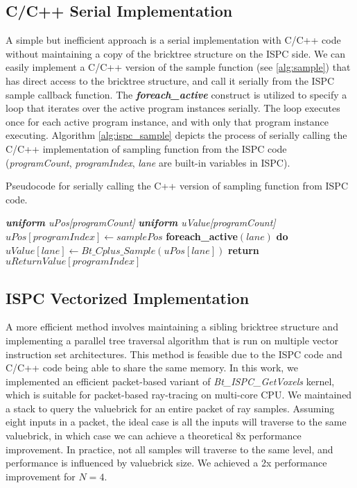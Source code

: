 \subsection{C/C++ Serial Implementation}

A simple but inefficient approach is a serial implementation with C/C++ code without
maintaining a copy of the bricktree structure on the ISPC side. We can easily 
implement a C/C++ version of the sample function (see \cref{alg:sample}) that has direct
access to the bricktree structure, and call it serially from the ISPC sample callback
function. The \textbf{\textit{foreach\_active}} construct is
utilized to specify a loop that iterates over the active program instances serially.
The loop executes once for each active program instance, and with only that program
instance executing. Algorithm \ref{alg:ispc_sample} depicts the process of serially calling 
the C/C++ implementation of sampling function from the ISPC code (\textit{programCount},
\textit{programIndex}, \textit{lane} are built-in variables in ISPC). 

\begin{algorithm}
	\caption{Pseudocode for serially calling the C++ version of sampling function from ISPC code. }\label{alg:ispc_sample}
	\begin{algorithmic}[1]
        	\State \textit{\textbf{uniform} uPos[programCount]}
            \State \textit{\textbf{uniform} uValue[programCount]}
            \State $uPos[programIndex] \gets samplePos$
            \State \textbf{foreach\_active}$(lane)$ \textbf{do}
            	\State \ \ \ \ $uValue[lane] \gets Bt\_Cplus\_Sample(uPos[lane])$
            \State \textbf{return} $uReturnValue[programIndex]$           
    	\EndProcedure
	\end{algorithmic}
\end{algorithm}


\subsection{ISPC Vectorized Implementation}
A more efficient method involves maintaining a sibling bricktree structure and 
implementing a parallel tree traversal algorithm that is run on multiple vector
instruction set architectures.
This method is feasible due to the ISPC code and C/C++ code being able to share the same memory.
In this work, we implemented an efficient packet-based variant of 
\textit{Bt\_ISPC\_GetVoxels} kernel, which is suitable for packet-based ray-tracing
on multi-core CPU. We maintained a stack to query the valuebrick for an entire
packet of ray samples. Assuming eight inputs in a packet, the ideal case is all the inputs will
traverse to the same valuebrick, in which case we can achieve a theoretical 8x performance
improvement. In practice, not all samples will traverse to the same level,
and performance is influenced by valuebrick size. We achieved a 2x performance
improvement for $N=4$.


